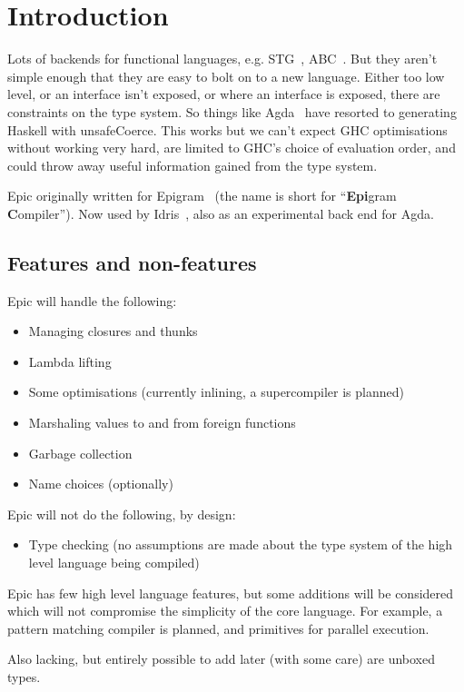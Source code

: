 \section{Introduction}

Lots of backends for functional languages,
e.g. STG~\cite{evalpush,stg,llvm-haskell}, ABC~\cite{abc-machine}.
But they aren't simple enough that they are easy to bolt on to a new
language. Either too low level, or an interface isn't exposed, or
where an interface is exposed, there are constraints on the type
system. So things like Agda~\cite{norell-thesis} have resorted to
generating Haskell with unsafeCoerce. This works but we can't expect
GHC optimisations without working very hard, are limited to GHC's
choice of evaluation order, and could throw away useful information
gained from the type system.

Epic originally written for Epigram~\cite{levitation} (the name is
short for ``\textbf{Epi}gram \textbf{C}ompiler''). Now used by
Idris~\cite{idris-plpv}, also as an experimental back end for Agda.

\subsection{Features and non-features}

Epic will handle the following:

\begin{itemize}
\item Managing closures and thunks
\item Lambda lifting
\item Some optimisations (currently inlining, a supercompiler is planned)
\item Marshaling values to and from foreign functions
\item Garbage collection
\item Name choices (optionally)
\end{itemize}

\noindent
Epic will not do the following, by design:

\begin{itemize}
\item Type checking (no assumptions are made about the type system of
  the high level language being compiled)
\end{itemize}

Epic has few high level language features, but some additions will be
considered which will not compromise the simplicity of the core
language. For example, a pattern matching compiler is planned, and
primitives for parallel execution.

Also lacking, but entirely possible to add later (with some care) are
unboxed types.
